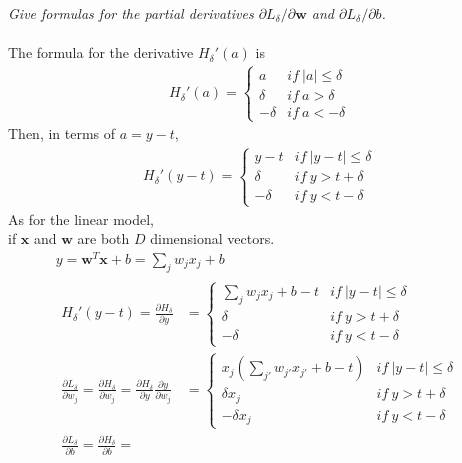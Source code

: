 \documentclass{myhw}
\begin{document}
\begin{homeworkProblem}
\begin{homeworkSection}
\emph{Give formulas for the partial derivatives $\partial L_\delta / \partial \textbf{w}$ and $\partial L_\delta / \partial b$. }\\
\\
The formula for the derivative $H_\delta '(a)$ is
\begin{gather*}
H_\delta'(a) = 
	\left\{ 
	\begin{array}{lr} 
	a & if\ |a| \le \delta \\ 
	\delta & if\ a > \delta \\
	- \delta & if\ a < -\delta
	\end{array} \right.
\end{gather*}
Then, in terms of $a=y-t$, 
\begin{gather*}
H_\delta'(y-t) = 
	\left\{ 
	\begin{array}{lr} 
	y-t & if\ |y-t| \le \delta \\ 
	\delta & if\ y > t + \delta \\
	- \delta & if\ y < t - \delta
	\end{array} \right.
\end{gather*}
As for the linear model, \\if $\textbf{x}$ and $\textbf{w}$ are both $D$ dimensional vectors. 
\begin{gather*}
y = \textbf{w}^T\textbf{x} + b = \sum_j{w_j x_j + b} \\
\begin{aligned}
H_\delta'(y-t) = \frac{\partial H_\delta}{\partial y} & = 
	\left\{ 
	\begin{array}{lr} 
	\sum_j{w_j x_j + b} - t & if\ |y-t| \le \delta \\ 
	\delta & if\ y > t + \delta \\
	- \delta & if\ y < t - \delta
	\end{array} \right.
\\
\frac{\partial L_\delta}{\partial w_j} = \frac{\partial H_\delta}{\partial w_j} = 
\frac{\partial H_\delta}{\partial y} \frac{\partial y}{\partial w_j} & = 
	\left\{ 
	\begin{array}{lr} 
	x_j (\sum_{j'}{w_{j'} x_{j'} + b} - t) & if\ |y-t| \le \delta \\ 
	\delta x_j & if\ y > t + \delta \\
	- \delta x_j & if\ y < t - \delta
	\end{array} \right.
\\
\frac{\partial L_\delta}{\partial b} = \frac{\partial H_\delta}{\partial b} =

\end{aligned}
\end{gather*}
\end{homeworkSection}
\end{homeworkProblem}
\end{document}
